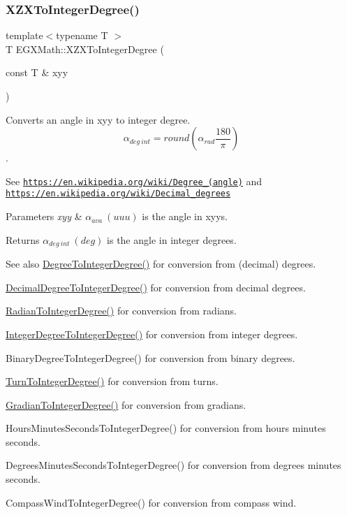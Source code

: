 \subsubsection{\texorpdfstring{X\+Z\+X\+To\+Integer\+Degree()}{XZXToIntegerDegree()}}
{\footnotesize\ttfamily template$<$typename T $>$ \\
T E\+G\+X\+Math\+::\+X\+Z\+X\+To\+Integer\+Degree (\begin{DoxyParamCaption}\item[{const T \&}]{xyy }\end{DoxyParamCaption})}



Converts an angle in xyy to integer degree. \[\alpha_{deg\ int}=round(\alpha_{rad}\frac{180}{\pi})\]. 

See \href{https://en.wikipedia.org/wiki/Degree_(angle)}{\tt https\+://en.\+wikipedia.\+org/wiki/\+Degree\+\_\+(angle)} and \href{https://en.wikipedia.org/wiki/Decimal_degrees}{\tt https\+://en.\+wikipedia.\+org/wiki/\+Decimal\+\_\+degrees} 
\begin{DoxyParams}{Parameters}
{\em xyy} & $\alpha_{ava}\ (uuu)$ is the angle in xyys. \\
\hline
\end{DoxyParams}
\begin{DoxyReturn}{Returns}
$\alpha_{deg\ int}\ (deg)$ is the angle in integer degrees. 
\end{DoxyReturn}
\begin{DoxySeeAlso}{See also}
\mbox{\hyperlink{group___e_g_x_math-_angle_conversions-_degree_gaabd20f21be3c18ee423d0bc1a677c6f6}{Degree\+To\+Integer\+Degree()}} for conversion from (decimal) degrees. 

\mbox{\hyperlink{group___e_g_x_math-_angle_conversions-_decimal_degree_ga115239ea7202dbc6a6c9fba68e0ac189}{Decimal\+Degree\+To\+Integer\+Degree()}} for conversion from decimal degrees. 

\mbox{\hyperlink{group___e_g_x_math-_angle_conversions-_radian_gac84796dfdeb56235e1e338522a5f9350}{Radian\+To\+Integer\+Degree()}} for conversion from radians. 

\mbox{\hyperlink{group___e_g_x_math-_angle_conversions-_integer_degree_gac9e870bdfa60dd2bb61469fdf6eedd7c}{Integer\+Degree\+To\+Integer\+Degree()}} for conversion from integer degrees. 

Binary\+Degree\+To\+Integer\+Degree() for conversion from binary degrees. 

\mbox{\hyperlink{group___e_g_x_math-_angle_conversions-_turn_ga999085c62490997da870618e20e88ebb}{Turn\+To\+Integer\+Degree()}} for conversion from turns. 

\mbox{\hyperlink{group___e_g_x_math-_angle_conversions-_gradian_ga555aae885f8a7d0876a36aa07cbbd816}{Gradian\+To\+Integer\+Degree()}} for conversion from gradians. 

Hours\+Minutes\+Seconds\+To\+Integer\+Degree() for conversion from hours minutes seconds. 

Degrees\+Minutes\+Seconds\+To\+Integer\+Degree() for conversion from degrees minutes seconds. 

Compass\+Wind\+To\+Integer\+Degree() for conversion from compass wind. 
\end{DoxySeeAlso}
